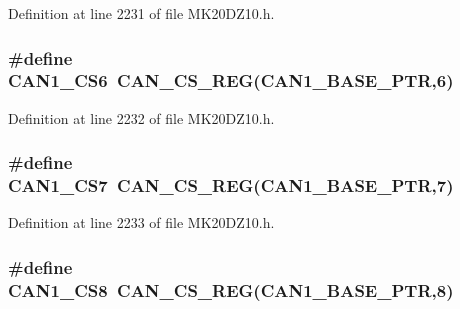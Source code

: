 Definition at line 2231 of file M\+K20\+D\+Z10.\+h.

\subsubsection[{\texorpdfstring{C\+A\+N1\+\_\+\+C\+S6}{CAN1_CS6}}]{\setlength{\rightskip}{0pt plus 5cm}\#define C\+A\+N1\+\_\+\+C\+S6~{\bf C\+A\+N\+\_\+\+C\+S\+\_\+\+R\+EG}({\bf C\+A\+N1\+\_\+\+B\+A\+S\+E\+\_\+\+P\+TR},6)}\hypertarget{group___c_a_n___register___accessor___macros_gaf1b0d35d5b81b086dded19f1962d07ed}{}\label{group___c_a_n___register___accessor___macros_gaf1b0d35d5b81b086dded19f1962d07ed}


Definition at line 2232 of file M\+K20\+D\+Z10.\+h.

\subsubsection[{\texorpdfstring{C\+A\+N1\+\_\+\+C\+S7}{CAN1_CS7}}]{\setlength{\rightskip}{0pt plus 5cm}\#define C\+A\+N1\+\_\+\+C\+S7~{\bf C\+A\+N\+\_\+\+C\+S\+\_\+\+R\+EG}({\bf C\+A\+N1\+\_\+\+B\+A\+S\+E\+\_\+\+P\+TR},7)}\hypertarget{group___c_a_n___register___accessor___macros_gaf4898a0f9b5f0339e298b00f1bb44b26}{}\label{group___c_a_n___register___accessor___macros_gaf4898a0f9b5f0339e298b00f1bb44b26}


Definition at line 2233 of file M\+K20\+D\+Z10.\+h.

\subsubsection[{\texorpdfstring{C\+A\+N1\+\_\+\+C\+S8}{CAN1_CS8}}]{\setlength{\rightskip}{0pt plus 5cm}\#define C\+A\+N1\+\_\+\+C\+S8~{\bf C\+A\+N\+\_\+\+C\+S\+\_\+\+R\+EG}({\bf C\+A\+N1\+\_\+\+B\+A\+S\+E\+\_\+\+P\+TR},8)}\hypertarget{group___c_a_n___register___accessor___macros_ga5ed9e2f398a8841d8f98514349ef48e8}{}\label{group___c_a_n___register___accessor___macros_ga5ed9e2f398a8841d8f98514349ef48e8}



